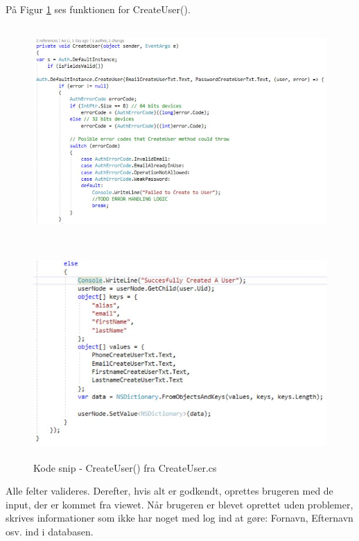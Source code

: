 På Figur \ref{fig:CreateUser} ses funktionen for CreateUser().
\begin{figure}[H] %
	\centering
	\includegraphics[height=8cm, width=17cm]{../ArkitekturDesign/Design/OpretBruger/CreateUser1}
\end{figure}
\begin{figure}[H] %
	\centering
	\includegraphics[height=8cm, width=17cm]{../ArkitekturDesign/Design/OpretBruger/CreateUser2}
	\caption{Kode snip - CreateUser() fra CreateUser.cs}
	\label{fig:CreateUser}
\end{figure}
Alle felter valideres. Derefter, hvis alt er godkendt, oprettes brugeren med de input, der er kommet fra viewet. Når brugeren er blevet oprettet uden problemer, skrives informationer som ikke har noget med log ind at gøre: Fornavn, Efternavn osv. ind i databasen.

\clearpage
